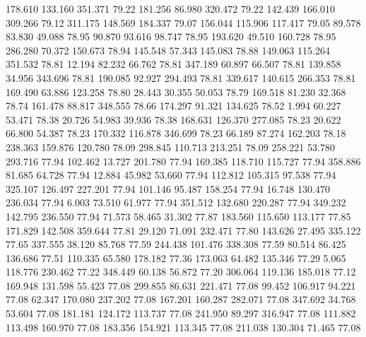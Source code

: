  178.610  133.160  351.371        79.22
 181.256   86.980  320.472        79.22
 142.439  166.010  309.266        79.12
 311.175  148.569  184.337        79.07
 156.044  115.906  117.417        79.05
  89.578   83.830   49.088        78.95
  90.870   93.616   98.747        78.95
 193.620   49.510  160.728        78.95
 286.280   70.372  150.673        78.94
 145.548   57.343  145.083        78.88
 149.063  115.264  351.532        78.81
  12.194   82.232   66.762        78.81
 347.189   60.897   66.507        78.81
 139.858   34.956  343.696        78.81
 190.085   92.927  294.493        78.81
 339.617  140.615  266.353        78.81
 169.490   63.886  123.258        78.80
  28.443   30.355   50.053        78.79
 169.518   81.230   32.368        78.74
 161.478   88.817  348.555        78.66
 174.297   91.321  134.625        78.52
   1.994   60.227   53.471        78.38
  20.726   54.983   39.936        78.38
 168.631  126.370  277.085        78.23
  20.622   66.800   54.387        78.23
 170.332  116.878  346.699        78.23
  66.189   87.274  162.203        78.18
 238.363  159.876  120.780        78.09
 298.845  110.713  213.251        78.09
 258.221   53.780  293.716        77.94
 102.462   13.727  201.780        77.94
 169.385  118.710  115.727        77.94
 358.886   81.685   64.728        77.94
  12.884   45.982   53.660        77.94
 112.812  105.315   97.538        77.94
 325.107  126.497  227.201        77.94
 101.146   95.487  158.254        77.94
  16.748  130.470  236.034        77.94
   6.003   73.510   61.977        77.94
 351.512  132.680  220.287        77.94
 349.232  142.795  236.550        77.94
  71.573   58.465   31.302        77.87
 183.560  115.650  113.177        77.85
 171.829  142.508  359.644        77.81
  29.120   71.091  232.471        77.80
 143.626   27.495  335.122        77.65
 337.555   38.120   85.768        77.59
 244.438  101.476  338.308        77.59
  80.514   86.425  136.686        77.51
 110.335   65.580  178.182        77.36
 173.063   64.482  135.346        77.29
   5.065  118.776  230.462        77.22
 348.449   60.138   56.872        77.20
 306.064  119.136  185.018        77.12
 169.948  131.598   55.423        77.08
 299.855   86.631  221.471        77.08
  99.452  106.917   94.221        77.08
  62.347  170.080  237.202        77.08
 167.201  160.287  282.071        77.08
 347.692   34.768   53.604        77.08
 181.181  124.172  113.737        77.08
 241.950   89.297  316.947        77.08
 111.882  113.498  160.970        77.08
 183.356  154.921  113.345        77.08
 211.038  130.304   71.465        77.08
